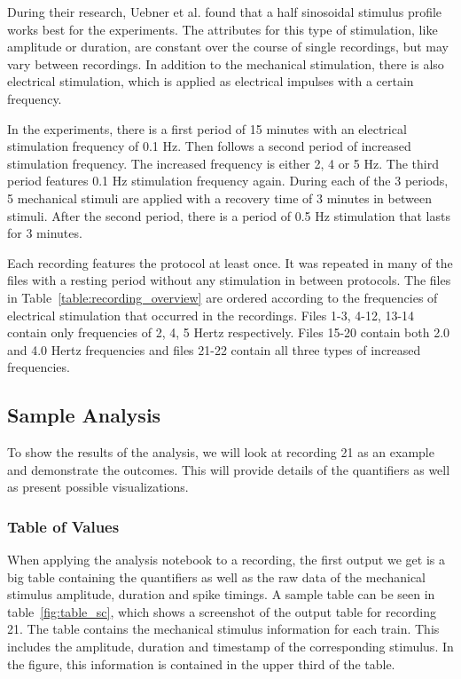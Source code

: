 During their research, Uebner et al. found that a half sinosoidal stimulus profile works best for the experiments. The attributes for this type of stimulation, like amplitude or duration, are constant over the course of single recordings, but may vary between recordings. In addition to the mechanical stimulation, there is also electrical stimulation, which is applied as electrical impulses with a certain frequency. 

In the experiments, there is a first period of 15 minutes with an electrical stimulation frequency of 0.1 Hz. Then follows a second period of increased stimulation frequency. The increased frequency is either 2, 4 or 5 Hz. The third period features 0.1 Hz stimulation frequency again. During each of the 3 periods, 5 mechanical stimuli are applied with a recovery time of 3 minutes in between stimuli. After the second period, there is a period of 0.5 Hz stimulation that lasts for 3 minutes. 

Each recording features the protocol at least once. It was repeated in many of the files with a resting period without any stimulation in between protocols. The files in Table~\ref{table:recording_overview} are ordered according to the frequencies of electrical stimulation that occurred in the recordings. Files 1-3, 4-12, 13-14 contain only frequencies of 2, 4, 5 Hertz respectively. Files 15-20 contain both 2.0 and 4.0 Hertz frequencies and files 21-22 contain all three types of increased frequencies.

\subsection{Sample Analysis}
To show the results of the analysis, we will look at recording 21 as an example and demonstrate the outcomes. This will provide details of the quantifiers as well as present possible visualizations.

\subsubsection{Table of Values}
When applying the analysis notebook to a recording, the first output we get is a big table containing the quantifiers as well as the raw data of the mechanical stimulus amplitude, duration and spike timings. A sample table can be seen in table~\ref{fig:table_sc}, which shows a screenshot of the output table for recording 21.
The table contains the mechanical stimulus information for each train. This includes the amplitude, duration and timestamp of the corresponding stimulus. In the figure, this information is contained in the upper third of the table.

